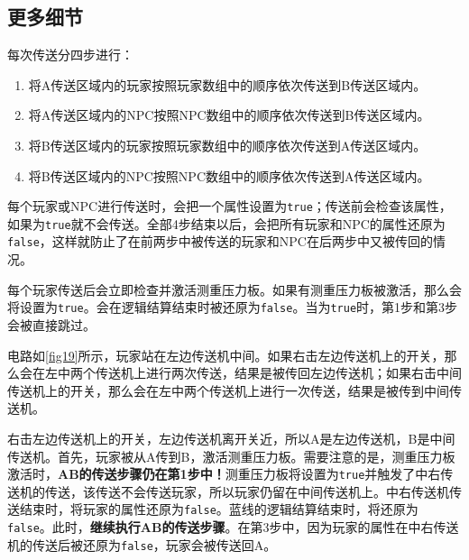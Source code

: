 \subsection{更多细节}\label{sec9}
每次传送分四步进行：
\begin{enumerate}
\item 将A传送区域内的玩家按照玩家数组中的顺序依次传送到B传送区域内。
\item 将A传送区域内的NPC按照NPC数组中的顺序依次传送到B传送区域内。
\item 将B传送区域内的玩家按照玩家数组中的顺序依次传送到A传送区域内。
\item 将B传送区域内的NPC按照NPC数组中的顺序依次传送到A传送区域内。
\end{enumerate}

每个玩家或NPC进行传送时，会把一个属性设置为\lstinline{true}；传送前会检查该属性，如果为\lstinline{true}就不会传送。全部4步结束以后，会把所有玩家和NPC的属性还原为\lstinline{false}，这样就防止了在前两步中被传送的玩家和NPC在后两步中又被传回的情况。

每个玩家传送后会立即检查并激活测重压力板。如果有测重压力板被激活，那么会将设置为\lstinline{true}。会在逻辑结算结束时被还原为\lstinline{false}。当为\lstinline{true}时，第1步和第3步会被直接跳过。

\begin{example}{}{}
电路如\autoref{fig19}所示，玩家站在左边传送机中间。如果右击左边传送机上的开关，那么会在左中两个传送机上进行两次传送，结果是被传回左边传送机；如果右击中间传送机上的开关，那么会在左中两个传送机上进行一次传送，结果是被传到中间传送机。

\begin{figure}[H]
\centering
{}%
%
\caption{}\label{fig19}
\end{figure}

右击左边传送机上的开关，左边传送机离开关近，所以A是左边传送机，B是中间传送机。首先，玩家被从A传到B，激活测重压力板。需要注意的是，测重压力板激活时，\textbf{AB的传送步骤仍在第1步中！}测重压力板将设置为\lstinline{true}并触发了中右传送机的传送，该传送不会传送玩家，所以玩家仍留在中间传送机上。中右传送机传送结束时，将玩家的属性还原为\lstinline{false}。蓝线的逻辑结算结束时，将还原为\lstinline{false}。此时，\textbf{继续执行AB的传送步骤}。在第3步中，因为玩家的属性在中右传送机的传送后被还原为\lstinline{false}，玩家会被传送回A。
\end{example}

